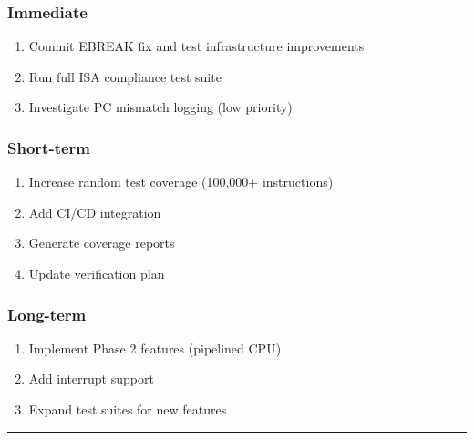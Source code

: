 \subsubsection{Immediate}\label{cr:app:archive-session-summary:immediate}

\begin{record}

\begin{enumerate}
\def\labelenumi{\arabic{enumi}.}
\tightlist
\item
  Commit EBREAK fix and test infrastructure improvements
\item
  Run full ISA compliance test suite
\item
  Investigate PC mismatch logging (low priority)
\end{enumerate}

\end{record}

\subsubsection{Short-term}\label{cr:app:archive-session-summary:short-term}

\begin{record}

\begin{enumerate}
\def\labelenumi{\arabic{enumi}.}
\tightlist
\item
  Increase random test coverage (100,000+ instructions)
\item
  Add CI/CD integration
\item
  Generate coverage reports
\item
  Update verification plan
\end{enumerate}

\end{record}

\subsubsection{Long-term}\label{cr:app:archive-session-summary:long-term}

\begin{record}

\begin{enumerate}
\def\labelenumi{\arabic{enumi}.}
\tightlist
\item
  Implement Phase 2 features (pipelined CPU)
\item
  Add interrupt support
\item
  Expand test suites for new features
\end{enumerate}

\begin{center}\rule{0.5\linewidth}{0.5pt}\end{center}

\end{record}

